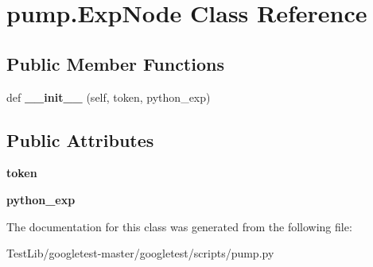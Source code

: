\hypertarget{classpump_1_1ExpNode}{}\section{pump.\+Exp\+Node Class Reference}
\label{classpump_1_1ExpNode}
\subsection*{Public Member Functions}
\begin{DoxyCompactItemize}
\item 
\mbox{\label{classpump_1_1ExpNode_a0808c394c4d3c8ac875005caa1b3e1b3}} 
def {\bfseries \+\_\+\+\_\+init\+\_\+\+\_\+} (self, token, python\+\_\+exp)
\end{DoxyCompactItemize}
\subsection*{Public Attributes}
\begin{DoxyCompactItemize}
\item 
\mbox{\label{classpump_1_1ExpNode_ade05a5a32535d717dc5c194569aaf356}} 
{\bfseries token}
\item 
\mbox{\label{classpump_1_1ExpNode_adccfe4778c2e34f6b2c88118c0f1587f}} 
{\bfseries python\+\_\+exp}
\end{DoxyCompactItemize}


The documentation for this class was generated from the following file\+:\begin{DoxyCompactItemize}
\item 
Test\+Lib/googletest-\/master/googletest/scripts/pump.\+py\end{DoxyCompactItemize}

